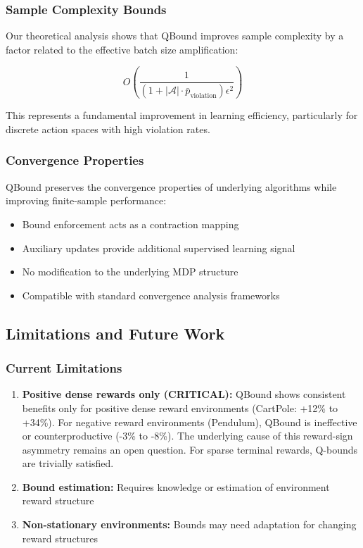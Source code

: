 \documentclass[11pt]{article}
\theoremstyle{definition}
\theoremstyle{remark}
\begin{document}
\subsubsection{Sample Complexity Bounds}

Our theoretical analysis shows that QBound improves sample complexity by a factor related to the effective batch size amplification:

$$O\left(\frac{1}{(1 + |\mathcal{A}| \cdot \bar{p}_{\text{violation}}) \epsilon^2}\right)$$

This represents a fundamental improvement in learning efficiency, particularly for discrete action spaces with high violation rates.

\subsubsection{Convergence Properties}

QBound preserves the convergence properties of underlying algorithms while improving finite-sample performance:

\begin{itemize}
    \item Bound enforcement acts as a contraction mapping
    \item Auxiliary updates provide additional supervised learning signal
    \item No modification to the underlying MDP structure
    \item Compatible with standard convergence analysis frameworks
\end{itemize}

\subsection{Limitations and Future Work}

\subsubsection{Current Limitations}

\begin{enumerate}
    \item \textbf{Positive dense rewards only (CRITICAL):} QBound shows consistent benefits only for positive dense reward environments (CartPole: +12\% to +34\%). For negative reward environments (Pendulum), QBound is ineffective or counterproductive (-3\% to -8\%). The underlying cause of this reward-sign asymmetry remains an open question. For sparse terminal rewards, Q-bounds are trivially satisfied.

    \item \textbf{Bound estimation:} Requires knowledge or estimation of environment reward structure

    \item \textbf{Non-stationary environments:} Bounds may need adaptation for changing reward structures
\end{enumerate}
\end{document}
